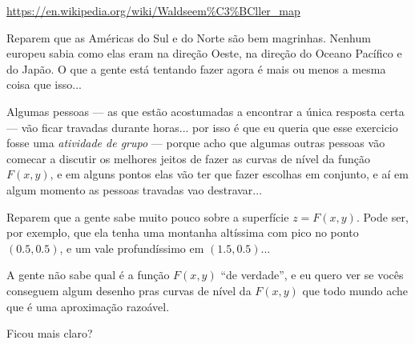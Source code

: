 \documentclass[oneside,12pt]{article}
\begin{document}
\ssk

\url{https://en.wikipedia.org/wiki/Waldseem\%C3\%BCller_map}

\ssk

Reparem que as Américas do Sul e do Norte são bem magrinhas. Nenhum
europeu sabia como elas eram na direção Oeste, na direção do Oceano
Pacífico e do Japão. O que a gente está tentando fazer agora é mais ou
menos a mesma coisa que isso...

Algumas pessoas --- as que estão acostumadas a encontrar a única
resposta certa --- vão ficar travadas durante horas... por isso é que
eu queria que esse exercicio fosse uma {\sl atividade de grupo} ---
porque acho que algumas outras pessoas vão comecar a discutir os
melhores jeitos de fazer as curvas de nível da função $F(x,y)$, e em
alguns pontos elas vão ter que fazer escolhas em conjunto, e aí em
algum momento as pessoas travadas vao destravar...

Reparem que a gente sabe muito pouco sobre a superfície $z = F(x,y)$.
Pode ser, por exemplo, que ela tenha uma montanha altíssima com pico
no ponto $(0.5,0.5)$, e um vale profundíssimo em $(1.5,0.5)$...

A gente não sabe qual é a função $F(x,y)$ ``de verdade'', e eu quero
ver se vocês conseguem algum desenho pras curvas de nível da $F(x,y)$
que todo mundo ache que é uma aproximação razoável.

Ficou mais claro?

\end{document}
